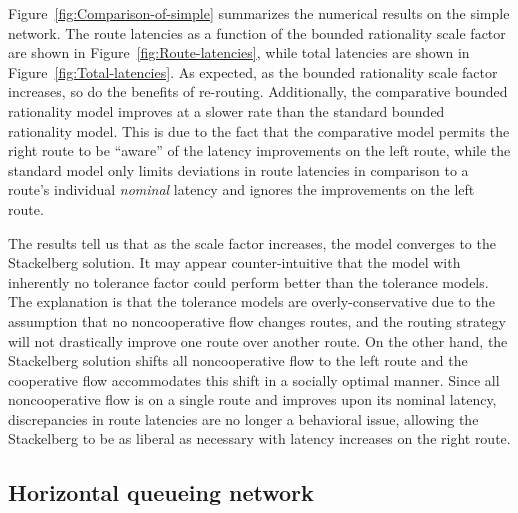 Figure~\ref{fig:Comparison-of-simple} summarizes the numerical results
on the simple network. The route latencies as a function of the bounded
rationality scale factor are shown in Figure~\ref{fig:Route-latencies},
while total latencies are shown in Figure~\ref{fig:Total-latencies}.
As expected, as the bounded rationality scale factor increases, so
do the benefits of re-routing. Additionally, the comparative bounded
rationality model improves at a slower rate than the standard bounded
rationality model. This is due to the fact that the comparative model
permits the right route to be ``aware'' of the latency improvements
on the left route, while the standard model only limits deviations
in route latencies in comparison to a route's individual \emph{nominal}
latency and ignores the improvements on the left route.

The results tell us that as the scale factor increases, the model
converges to the Stackelberg solution. It may appear counter-intuitive
that the model with inherently no tolerance factor could perform better
than the tolerance models. The explanation is that the tolerance models
are overly-conservative due to the assumption that no noncooperative
flow changes routes, and the routing strategy will not drastically
improve one route over another route. On the other hand, the Stackelberg
solution shifts all noncooperative flow to the left route and the
cooperative flow accommodates this shift in a socially optimal manner.
Since all noncooperative flow is on a single route and improves upon
its nominal latency, discrepancies in route latencies are no longer
a behavioral issue, allowing the Stackelberg to be as liberal as necessary
with latency increases on the right route.


\subsection{Horizontal queueing network\label{sub:Horizontal-Queueing-Network:}}

\begin{figure}[h]
\centering
{}\hfill%
%
\end{figure}

